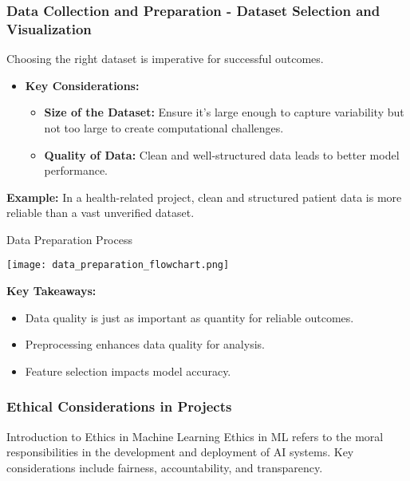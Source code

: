 \documentclass{beamer}
\begin{document}
\begin{frame}[fragile]
    \frametitle{Data Collection and Preparation - Dataset Selection and Visualization}
    Choosing the right dataset is imperative for successful outcomes.
    \begin{itemize}
        \item \textbf{Key Considerations:}
        \begin{itemize}
            \item \textbf{Size of the Dataset:} Ensure it's large enough to capture variability but not too large to create computational challenges.
            \item \textbf{Quality of Data:} Clean and well-structured data leads to better model performance.
        \end{itemize}
    \end{itemize}
    \textbf{Example:} In a health-related project, clean and structured patient data is more reliable than a vast unverified dataset.
    
    \begin{block}{Data Preparation Process}
        \begin{center}
            \texttt{[image: data\_preparation\_flowchart.png]} %
        \end{center}
    \end{block}
    
    \textbf{Key Takeaways:}
    \begin{itemize}
        \item Data quality is just as important as quantity for reliable outcomes.
        \item Preprocessing enhances data quality for analysis.
        \item Feature selection impacts model accuracy.
    \end{itemize}
\end{frame}

\begin{frame}[fragile]
    \frametitle{Ethical Considerations in Projects}
    \begin{block}{Introduction to Ethics in Machine Learning}
        Ethics in ML refers to the moral responsibilities in the development and deployment of AI systems. 
        Key considerations include fairness, accountability, and transparency.
    \end{block}
\end{frame}
\end{document}
